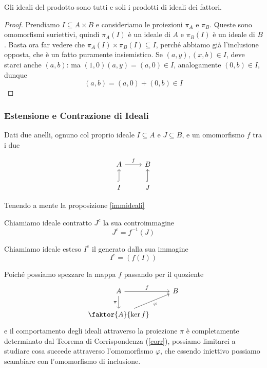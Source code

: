 \begin{multicols}{2}
\begin{prop}
Gli ideali del prodotto sono tutti e soli i prodotti di ideali dei fattori.
\end{prop}
\begin{proof}
	Prendiamo $ I \subseteq A \times B $ e consideriamo le proiezioni $ \pi_A $ e $ \pi_B $. Queste sono omomorfismi suriettivi, quindi $ \pi_A(I) $ è un ideale di $ A $ e $ \pi_B(I) $ è un ideale di $ B $. Basta ora far vedere che $ \pi_A(I) \times \pi_B(I) \subseteq I $, perché abbiamo già l'inclusione opposta, che è un fatto puramente insiemistico. Se $ (a, y), (x, b) \in I $, deve starci anche $ (a, b) $: ma $ (1, 0)(a, y) = (a, 0) \in I $, analogamente $ (0, b) \in I $, dunque
	\[ (a, b) = (a, 0) + (0, b) \in I \]
\end{proof}
 

\subsubsection{Estensione e Contrazione di Ideali} Dati due anelli, ognuno col proprio ideale $ I \subseteq A $ e $ J  \subseteq B $, e un omomorfismo $ f $ tra i due

\[ \begin{tikzcd}
A \arrow{r}{f}  & B \\
I \arrow[swap, hook]{u}{} & J \arrow[swap, hook]{u}{}
\end{tikzcd} \]

Tenendo a mente la proposizione \ref{immideali}

\begin{definition}
	Chiamiamo ideale contratto $ J^c $ la sua controimmagine $$  J^c = f^{-1}(J)  $$
\end{definition}
\begin{definition}
	Chiamiamo ideale esteso $ I^e $ il generato dalla sua immagine
	\[I^e = \left(f(I)\right) \]
\end{definition}

Poiché possiamo spezzare la mappa $ f $ passando per il quoziente
\[ \begin{tikzcd}
A \arrow{r}{f} \arrow[swap]{d}{\pi} & B \\
\faktor{A}{\ker f} \arrow[swap]{ru}{\varphi}
\end{tikzcd} \]
e il comportamento degli ideali attraverso la proiezione $ \pi $ è completamente determinato dal Teorema di Corrispondenza (\ref{corr}), possiamo limitarci a studiare cosa succede attraverso l'omomorfismo $ \varphi $, che essendo iniettivo possiamo scambiare con l'omomorfismo di inclusione.


\end{multicols}
